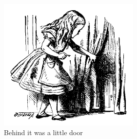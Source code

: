 \begin{figure}
\begin{center}
\includegraphics[width=7cm]{figures/alice}
\end{center}
\caption{Behind it was a little door}
\label{fig:alice}
\end{figure}
